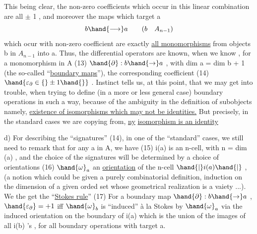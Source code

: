 
This being  clear,  the non-zero coefficients which occur in this
linear combination are all $\pm$ 1 ,  and moreover the maps which target a
\[ b \hand{\longrightarrow} a \qquad (b \quad A_{n-1}) \]
which ocur with non-zero coefficient are exactly \uline{all monomorphisms}
from objects b in $A_{n-1}$ into a.  Thus,  the differential operators are
known,  when we know ,  for a monomorphism in A
(13) \qquad $\hand{\partial}: b \hand{\to} a$ \quad , \quad with \quad dim a = dim b + 1
(the so-called ``\uline{boundary maps}''),  the corresponding coefficient
(14) \qquad $\hand{\varepsilon_{\partial} \in \{}\pm 1\hand{\}}$ .
Instinct tells us,  at this point,  that we may get into trouble,  when
trying to define (in a more or less general case)  boundary operations
in such a way,  because of the ambiguity in the definition of subobjects\hand{,}
namely,   \uline{existence of isomorphisms which may not be identities.}
But precisely,  in the standard cases we are  copying from,  \uline{ny}
\uline{isomorphism is an identity}\hand{!}

d)  For describing the ``signatures'' (14),  in one of the ``standard''
cases,  we still need to remark that  for any a in A,  we have
(15) \qquad i(a)  is an n-cell,  with  n = dim (a) \quad ,
and the choice of the  signatures will be determined by a choice
of orientations
(16) \qquad $\hand{\omega}_a$ an \uline{orientation} of the n-cell $\hand{|}i(a)\hand{|}$ \quad ,
(a notion which could be given a purely combinatorial definition,  
induction on the dimension of a given orded set whose geometrical
realization is a vaiety ...).  We the get the ``\uline{Stokes rule}''
(17) \quad For a boundary map $\hand{\partial}: b \hand{\to} a$ \quad , $\hand{\varepsilon_{\partial}} = +1$  iff $\hand{\omega}_b$ is ``induced'' à
la Stokes by $\hand{\omega}_a$\hand{,} via the induced orientation on the boundary
of  i(a) \hand{(} which is the union of the images of all  i(b) 's ,
for all boundary operations with target a\hand{)}.

